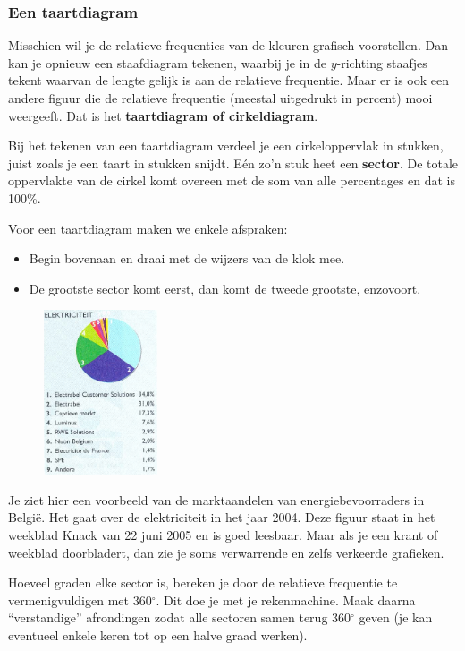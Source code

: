 \documentclass[11pt]{article}
\newcommand{\degree}{\ensuremath{^\circ}}
\begin{document}
\subsubsection*{Een taartdiagram}
Misschien wil je de relatieve frequenties van de kleuren grafisch voorstellen. Dan kan je opnieuw een
staafdiagram tekenen, waarbij je in de $y$-richting staafjes tekent waarvan de lengte gelijk is aan de
relatieve frequentie.
Maar er is ook een andere figuur die de relatieve frequentie (meestal uitgedrukt in percent) mooi
weergeeft. Dat is het {\bf taartdiagram of cirkeldiagram}.

Bij het tekenen van een taartdiagram verdeel je een cirkeloppervlak in stukken, juist zoals je een
taart in stukken snijdt. Eén zo'n stuk heet een {\bf sector}. De totale oppervlakte van de cirkel komt overeen
met de som van alle percentages en dat is 100\%.

Voor een taartdiagram maken we enkele afspraken:
\begin{itemize}
  \item Begin bovenaan en draai met de wijzers van de klok mee.
  \item De grootste sector komt eerst, dan komt de tweede
grootste, enzovoort.
\end{itemize}

\begin{figure}
  \vspace{-0.5cm}
  \includegraphics[width=0.3\textwidth]{cirkeldiagram_electriciteit}
\end{figure}
Je ziet hier een voorbeeld van de marktaandelen van
energiebevoorraders in België. Het gaat over de elektriciteit in
het jaar 2004. Deze figuur staat in het weekblad Knack van 22
juni 2005 en is goed leesbaar. Maar als je een krant of
weekblad doorbladert, dan zie je soms verwarrende en zelfs
verkeerde grafieken.

Hoeveel graden elke sector is, bereken je door de relatieve
frequentie te vermenigvuldigen met $360\degree$. Dit doe je met je
rekenmachine. Maak daarna “verstandige” afrondingen zodat
alle sectoren samen terug $360\degree$ geven (je kan
eventueel enkele keren tot op een halve graad werken).
\end{document}
